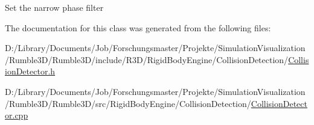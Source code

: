 Set the narrow phase filter 

The documentation for this class was generated from the following files\+:\begin{DoxyCompactItemize}
\item 
D\+:/\+Library/\+Documents/\+Job/\+Forschungsmaster/\+Projekte/\+Simulation\+Visualization/\+Rumble3\+D/\+Rumble3\+D/include/\+R3\+D/\+Rigid\+Body\+Engine/\+Collision\+Detection/\mbox{\hyperlink{_collision_detector_8h}{Collision\+Detector.\+h}}\item 
D\+:/\+Library/\+Documents/\+Job/\+Forschungsmaster/\+Projekte/\+Simulation\+Visualization/\+Rumble3\+D/\+Rumble3\+D/src/\+Rigid\+Body\+Engine/\+Collision\+Detection/\mbox{\hyperlink{_collision_detector_8cpp}{Collision\+Detector.\+cpp}}\end{DoxyCompactItemize}
